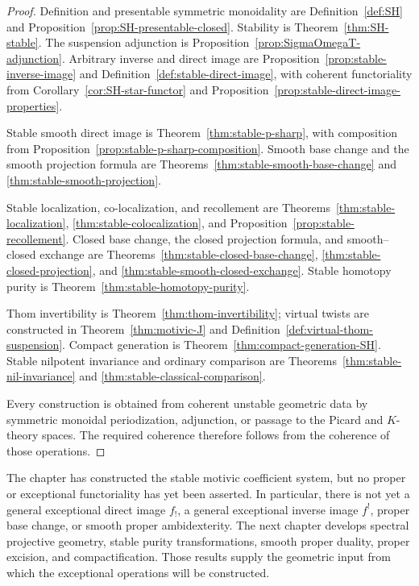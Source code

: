 \begin{proof}
Definition and presentable symmetric monoidality are
Definition~\ref{def:SH} and Proposition~\ref{prop:SH-presentable-closed}.  Stability is
Theorem~\ref{thm:SH-stable}.  The suspension adjunction is
Proposition~\ref{prop:SigmaOmegaT-adjunction}.  Arbitrary inverse and direct image are
Proposition~\ref{prop:stable-inverse-image} and Definition~\ref{def:stable-direct-image}, with
coherent functoriality from Corollary~\ref{cor:SH-star-functor} and
Proposition~\ref{prop:stable-direct-image-properties}.

Stable smooth direct image is Theorem~\ref{thm:stable-p-sharp}, with composition from
Proposition~\ref{prop:stable-p-sharp-composition}.  Smooth base change and the smooth projection
formula are Theorems~\ref{thm:stable-smooth-base-change} and
\ref{thm:stable-smooth-projection}.

Stable localization, co-localization, and recollement are
Theorems~\ref{thm:stable-localization}, \ref{thm:stable-colocalization}, and
Proposition~\ref{prop:stable-recollement}.  Closed base change, the closed projection formula, and
smooth--closed exchange are Theorems~\ref{thm:stable-closed-base-change},
\ref{thm:stable-closed-projection}, and \ref{thm:stable-smooth-closed-exchange}.
Stable homotopy purity is
Theorem~\ref{thm:stable-homotopy-purity}.

Thom invertibility is Theorem~\ref{thm:thom-invertibility}; virtual twists are constructed in
Theorem~\ref{thm:motivic-J} and Definition~\ref{def:virtual-thom-suspension}.  Compact generation is
Theorem~\ref{thm:compact-generation-SH}.  Stable nilpotent invariance and ordinary comparison are
Theorems~\ref{thm:stable-nil-invariance} and \ref{thm:stable-classical-comparison}.

Every construction is obtained from coherent unstable geometric data by symmetric monoidal
periodization, adjunction, or passage to the Picard and $K$-theory spaces.  The required coherence
therefore follows from the coherence of those operations.
\end{proof}

The chapter has constructed the stable motivic coefficient system, but no proper or exceptional
functoriality has yet been asserted.  In particular, there is not yet a general exceptional direct image
$f_!$, a general exceptional inverse image $f^!$, proper base change, or smooth proper
ambidexterity.  The next chapter develops spectral projective geometry, stable purity
transformations, smooth proper duality, proper excision, and compactification.  Those results supply
the geometric input from which the exceptional operations will be constructed.
